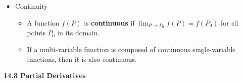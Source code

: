\documentclass[12pt]{article}
\newcommand{\ds}{\displaystyle}
\newcommand{\<}{\left<}
\renewcommand{\>}{\right>}
\begin{document}
\begin{itemize}
  \item Continuity
  
    \begin{itemize}
      \item A function $f(P)$ is \textbf{continuous} if $\ds \lim_{P\to P_0}f(P) = f(P_0)$ for all points $P_0$ in its domain.
      \item If a multi-variable function is composed of continuous single-variable functions, then it is also continuous.
    \end{itemize}
  
  

\end{itemize}

\newpage

\centerline{\bf 14.3 Partial Derivatives}
\end{document}
